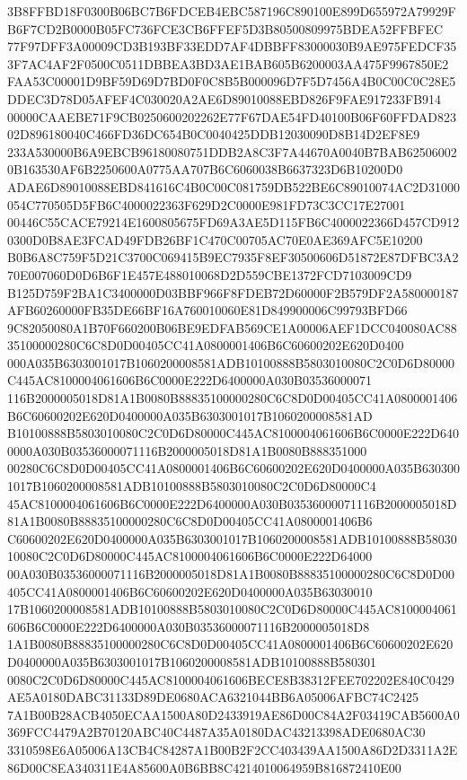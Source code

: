 \documentclass[UTF8,fontset=fandol,zihao=-4,a4paper]{ctexart}
\begin{document}
{{3B8FFBD18F0300B06BC7B6FDCEB4EBC587196C890100E899D655972A79929FB6F7CD2B0000B05FC736FCE3CB6FFEF5D3B80500809975BDEA52FFBFEC
77F97DFF3A00009CD3B193BF33EDD7AF4DBBFF83000030B9AE975FEDCF353F7AC4AF2F0500C0511DBBEA3BD3AE1BAB605B6200003AA475F9967850E2
FAA53C00001D9BF59D69D7BD0F0C8B5B000096D7F5D7456A4B0C00C0C28E5DDEC3D78D05AFEF4C030020A2AE6D89010088EBD826F9FAE917233FB914
00000CAAEBE71F9CB0250600202262E77F67DAE54FD40100B06F60FFDAD82302D896180040C466FD36DC654B0C0040425DDB12030090D8B14D2EF8E9
233A530000B6A9EBCB96180080751DDB2A8C3F7A44670A0040B7BAB625060020B163530AF6B2250600A0775AA707B6C6060038B6637323D6B10200D0
ADAE6D89010088EBD841616C4B0C00C081759DB522BE6C89010074AC2D31000054C770505D5FB6C4000022363F629D2C0000E981FD73C3CC17E27001
00446C55CACE79214E1600805675FD69A3AE5D115FB6C4000022366D457CD9120300D0B8AE3FCAD49FDB26BF1C470C00705AC70E0AE369AFC5E10200
B0B6A8C759F5D21C3700C069415B9EC7935F8EF30500606D51872E87DFBC3A270E007060D0D6B6F1E457E488010068D2D559CBE1372FCD7103009CD9
B125D759F2BA1C3400000D03BBF966F8FDEB72D60000F2B579DF2A580000187AFB60260000FB35DE66BF16A760010060E81D849900006C99793BFD66
9C82050080A1B70F660200B06BE9EDFAB569CE1A00006AEF1DCC040080AC8835100000280C6C8D0D00405CC41A0800001406B6C60600202E620D0400
000A035B6303001017B1060200008581ADB10100888B5803010080C2C0D6D80000C445AC8100004061606B6C0000E222D6400000A030B03536000071
116B2000005018D81A1B0080B88835100000280C6C8D0D00405CC41A0800001406B6C60600202E620D0400000A035B6303001017B1060200008581AD
B10100888B5803010080C2C0D6D80000C445AC8100004061606B6C0000E222D6400000A030B03536000071116B2000005018D81A1B0080B888351000
00280C6C8D0D00405CC41A0800001406B6C60600202E620D0400000A035B6303001017B1060200008581ADB10100888B5803010080C2C0D6D80000C4
45AC8100004061606B6C0000E222D6400000A030B03536000071116B2000005018D81A1B0080B88835100000280C6C8D0D00405CC41A0800001406B6
C60600202E620D0400000A035B6303001017B1060200008581ADB10100888B5803010080C2C0D6D80000C445AC8100004061606B6C0000E222D64000
00A030B03536000071116B2000005018D81A1B0080B88835100000280C6C8D0D00405CC41A0800001406B6C60600202E620D0400000A035B63030010
17B1060200008581ADB10100888B5803010080C2C0D6D80000C445AC8100004061606B6C0000E222D6400000A030B03536000071116B2000005018D8
1A1B0080B88835100000280C6C8D0D00405CC41A0800001406B6C60600202E620D0400000A035B6303001017B1060200008581ADB10100888B580301
0080C2C0D6D80000C445AC8100004061606BECE8B38312FEE702202E840C0429AE5A0180DABC31133D89DE0680ACA6321044BB6A05006AFBC74C2425
7A1B00B28ACB4050ECAA1500A80D2433919AE86D00C84A2F03419CAB5600A0369FCC4479A2B70120ABC40C4487A35A0180DAC43213398ADE0680AC30
3310598E6A05006A13CB4C84287A1B00B2F2CC403439AA1500A86D2D3311A2E86D00C8EA340311E4A85600A0B6BB8C4214010064959B816872410E00
}}
\end{document}
